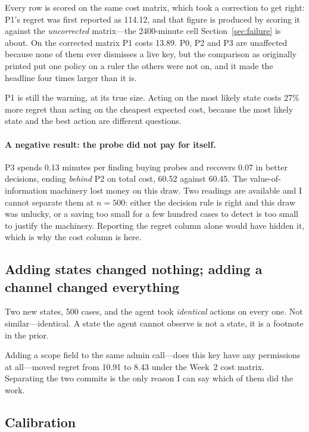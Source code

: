 \documentclass{article}
\begin{document}
Every row is scored on the same cost matrix, which took a correction to get
right: P1's regret was first reported as 114.12, and that figure is produced by
scoring it against the \emph{uncorrected} matrix---the 2400-minute cell
Section~\ref{sec:failure} is about. On the corrected matrix P1 costs 13.89.
P0, P2 and P3 are unaffected because none of them ever dismisses a live key, but
the comparison as originally printed put one policy on a ruler the others were
not on, and it made the headline four times larger than it is.

P1 is still the warning, at its true size. Acting on the most likely state costs
27\% more regret than acting on the cheapest expected cost, because the most
likely state and the best action are different questions.

\paragraph{A negative result: the probe did not pay for itself.} P3 spends 0.13
minutes per finding buying probes and recovers 0.07 in better decisions, ending
\emph{behind} P2 on total cost, 60.52 against 60.45. The value-of-information
machinery lost money on this draw. Two readings are available and I cannot
separate them at $n = 500$: either the decision rule is right and this draw was
unlucky, or a saving too small for a few hundred cases to detect is too small to
justify the machinery. Reporting the regret column alone would have hidden it,
which is why the cost column is here.

\subsection{Adding states changed nothing; adding a channel changed everything}

Two new states, 500 cases, and the agent took \emph{identical} actions on every
one. Not similar---identical. A state the agent cannot observe is not a state, it
is a footnote in the prior.

Adding a scope field to the same admin call---does this key have any permissions
at all---moved regret from 10.91 to 8.43 under the Week~2 cost matrix. Separating
the two commits is the only reason I can say which of them did the work.

\subsection{Calibration}
\end{document}
